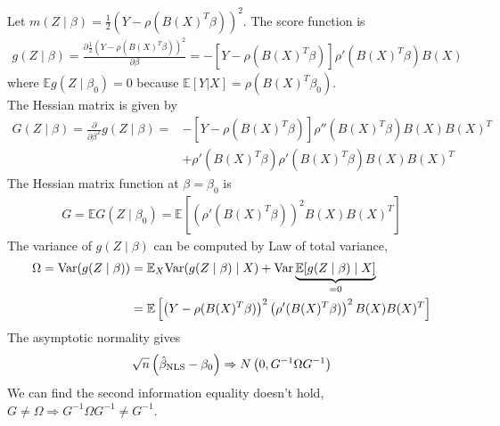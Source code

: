 \documentclass[11pt]{elegantbook}
\begin{document}
Let $m(Z\mid\beta)=\frac{1}{2}(Y-\rho(B(X)^T\beta))^2$. The score function is
\begin{equation}
    \begin{aligned}
        g(Z\mid \beta)=\frac{\partial \frac{1}{2}(Y-\rho(B(X)^T\beta))^2}{\partial \beta}=-\left[Y-\rho(B(X)^T\beta)\right]\rho'(B(X)^T\beta)B(X)
    \end{aligned}
    \nonumber
\end{equation}
where $\mathbb{E}g(Z\mid \beta_0)=0$ because $\mathbb{E}[Y|X]=\rho(B(X)^T\beta_0)$.\\
The Hessian matrix is given by
\begin{equation}
    \begin{aligned}
        G(Z\mid \beta)=\frac{\partial}{\partial \beta^T}g(Z\mid \beta)=&-\left[Y-\rho(B(X)^T\beta)\right]\rho''(B(X)^T\beta)B(X)B(X)^T\\
        &+\rho'(B(X)^T\beta)\rho'(B(X)^T\beta)B(X)B(X)^T
    \end{aligned}
    \nonumber
\end{equation}
The Hessian matrix function at $\beta=\beta_0$ is
\begin{equation}
    \begin{aligned}
        G=\mathbb{E}G(Z\mid\beta_0)=\mathbb{E}\left[(\rho'(B(X)^T\beta))^2B(X)B(X)^T\right]
    \end{aligned}
    \nonumber
\end{equation}
The variance of $g(Z\mid \beta)$ can be computed by Law of total variance,
\begin{equation}
    \begin{aligned}
        \Omega=\textnormal{Var}(g(Z\mid \beta))&=\mathbb{E}_X\textnormal{Var}(g(Z\mid \beta)\mid X)+\textnormal{Var}\underbrace{\mathbb{E}[g(Z\mid \beta)\mid X]}_{=0}\\
        &=\mathbb{E}\left[\left(Y-\rho(B(X)^T\beta)\right)^2\left(\rho'(B(X)^T\beta)\right)^2B(X)B(X)^T\right]
    \end{aligned}
    \nonumber
\end{equation}
The asymptotic normality gives
\begin{equation}
    \begin{aligned}
        \sqrt{n}\left(\hat{\beta}_\textnormal{NLS}-\beta_0\right) \Rightarrow N\left(0,G^{-1}\Omega G^{-1}\right)
    \end{aligned}
    \nonumber
\end{equation}
We can find the second information equality doesn't hold, $G\neq\Omega \Rightarrow G^{-1}\Omega G^{-1}\neq G^{-1}$.
\end{document}

